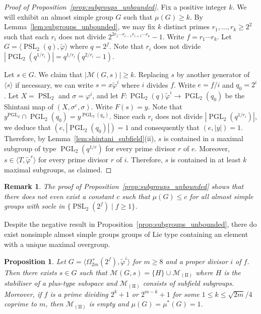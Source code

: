 \documentclass[11pt]{article}
\numberwithin{equation}{section}
\theoremstyle{shdefinition}
\newtheorem{remark}[definition]{Remark}
\theoremstyle{shplain}
\newtheorem{proposition}[definition]{Proposition}
\newcommand{\p}{\varphi}
\renewcommand{\wp}{\widetilde{\varphi}}
\newcommand{\s}{\sigma}
\newcommand{\M}{\mathcal{M}}
\newcommand{\<}{\langle}
\renewcommand{\>}{\rangle}
\renewcommand{\leq}{\leqslant}
\renewcommand{\geq}{\geqslant}
\renewcommand{\:}{\colon}
\newcommand{\PSL}{\operatorname{PSL}}
\newcommand{\PGL}{\operatorname{PGL}}
\newcommand{\Om}{\Omega}
\begin{document}
\begin{proof}[Proof of Proposition~\ref{prop:subgroups_unbounded}]
Fix a positive integer $k$. We will exhibit an almost simple group $G$ such that $\mu(G) \geq k$. By Lemma~\ref{lem:subgroups_unbounded}, we may fix $k$ distinct primes $r_1,\dots,r_k \geq 2^2$ such that each $r_i$ does not divide $2^{2r_1 \cdots r_{i-1} r_{i+1} \cdots r_k} - 1$. Write $f=r_1 \cdots r_k$. Let $G = \< \PSL_2(q), \wp \>$ where $q=2^f$. Note that $r_i$ does not divide $|\PGL_2(q^{1/r_i})| = q^{1/r_i}(q^{2/r_i}-1)$. 

Let $s \in G$. We claim that $|\M(G,s)| \geq k$. Replacing $s$ by another generator of $\<s\>$ if necessary, we can write $s = x\wp^i$ where $i$ divides $f$. Write $e=f/i$ and $q_0=2^i$. Let $X = \PSL_2$ and $\s = \p^i$, and let $F\:\PGL_2(q)\wp^i \to \PGL_2(q_0)$ be the Shintani map of $(X,\s^e,\s)$. Write $F(s) = y$. Note that $y^{\PGL_2} \cap \PGL_2(q_0) = y^{\PGL_2(q_0)}$. Since each $r_i$ does not divide $|\PGL_2(q^{1/r_i})|$, we deduce that $(e,|\PGL_2(q_0)|)=1$ and consequently that $(e,|y|)=1$. Therefore, by Lemma~\ref{lem:shintani_subfield}(ii), $s$ is contained in a maximal subgroup of type $\PGL_2(q^{1/r})$ for every prime divisor $r$ of $e$. Moreover, $s \in \<T,\wp^r\>$ for every prime divisor $r$ of $i$. Therefore, $s$ is contained in at least $k$ maximal subgroups, as claimed.
\end{proof}

\begin{remark} \label{rem:subgroups_unbounded}
The proof of Proposition~\ref{prop:subgroups_unbounded} shows that there does not even exist a constant $c$ such that $\mu(G) \leq c$ for all almost simple groups with socle in $\{ \PSL_2(2^f) \mid f \geq 1 \}$. 
\end{remark}

Despite the negative result in Proposition~\ref{prop:subgroups_unbounded}, there do exist nonsimple almost simple groups groups of Lie type containing an element with a unique maximal overgroup.

\begin{proposition} \label{prop:subgroups_unique}
Let $G = \< \Om^+_{2m}(2^f), \wp^i\>$ for $m \geq 8$ and a proper divisor $i$ of $f$. Then there exists $s \in G$ such that $\M(G,s) = \{ H \} \cup \M_{\mathrm{(II)}}$ where $H$ is the stabiliser of a plus-type subspace and $\M_{\mathrm{(II)}}$ consists of subfield subgroups. Moreover, if $f$ is a prime dividing $2^k+1$ or $2^{m-k}+1$ for some $1 \leq k \leq \sqrt{2m}/4$ coprime to $m$, then $\M_{\mathrm{(II)}}$ is empty and $\mu(G) = \mu^*(G) = 1$.
\end{proposition}
\end{document}
